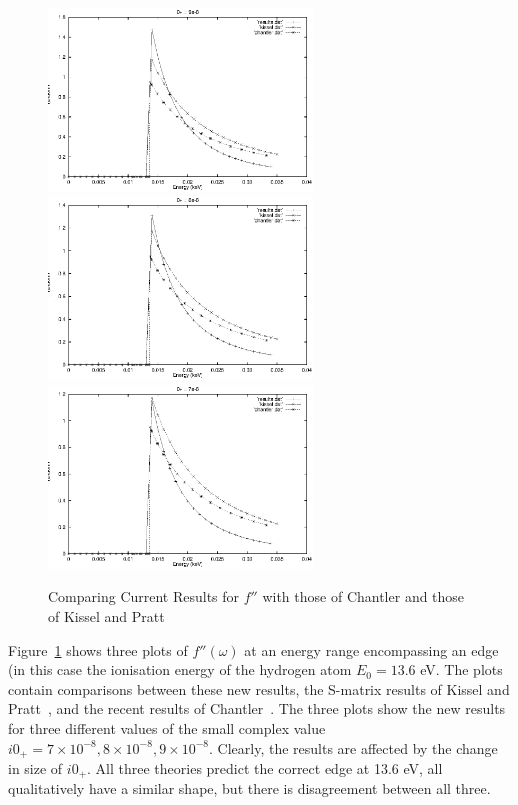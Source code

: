 \begin{figure}[h]
\begin{center}
    \includegraphics[width=7cm]{compare_fpp_1.eps}
    \includegraphics[width=7cm]{compare_fpp_2.eps}
    \includegraphics[width=7cm]{compare_fpp_3.eps}
    \caption{Comparing Current Results for $f''$ with those of Chantler
             and those of Kissel and Pratt}
    \label{fig:fpp-compare}
\end{center} 
\end{figure}
Figure~\ref{fig:fpp-compare} shows three plots of $f''(\omega)$ at an energy
range encompassing an edge (in this case the ionisation energy of the hydrogen
atom $E_0 = 13.6$ eV. The plots contain comparisons between these new results,
the S-matrix results of Kissel and Pratt~\cite{Kissel-S-Matrix}, and
the recent results of Chantler~\cite{Chantler-Tabulation}. 
The three plots show the new results for three different values of the
small complex value $i0_+ = 7\times 10^{-8},8\times 10^{-8},9\times 10^{-8}$.
Clearly, the results are affected by the change in size of $i0_+$.
All three theories predict the correct edge at 13.6 eV, all qualitatively
have a similar shape, but there is disagreement between all three.


